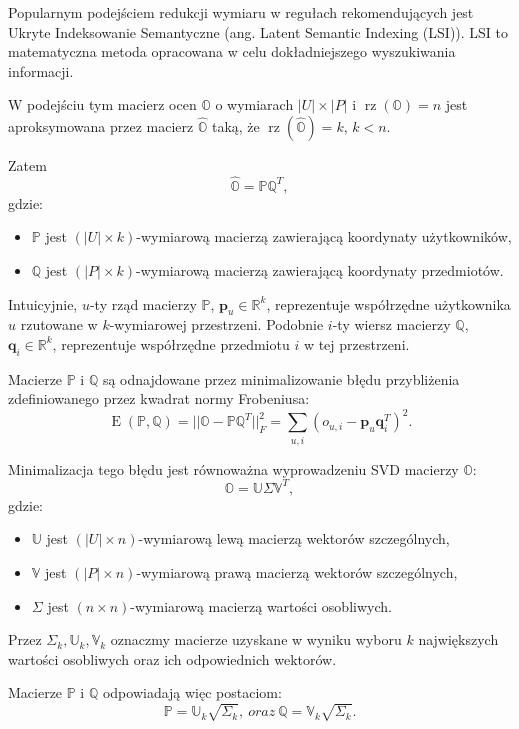 \documentclass[12pt,a4paper]{report}
\newcommand{\setR}{\mathbb{R}}
\newcommand{\rz}[1]{\operatorname{rz}\left({#1} \right)}
\newcommand{\e}[1]{\operatorname{E}\left({#1} \right)}
\begin{document}
Popularnym podejściem redukcji wymiaru w regułach rekomendujących jest Ukryte Indeksowanie Semantyczne (ang. Latent Semantic Indexing (LSI)). LSI to matematyczna metoda opracowana w celu dokładniejszego wyszukiwania informacji.

W podejściu tym macierz ocen $\mathbb{O}$ o wymiarach $|\mathit{U}| \times |\mathit{P}|$ i $\rz{\mathbb{O}} = n$ jest aproksymowana przez macierz $\widehat{\mathbb{O}}$ taką, że $\rz{\widehat{\mathbb{O}}} = k$, $k<n$. 

Zatem
$$
\widehat{\mathbb{O}} = \mathbb{P}\mathbb{Q}^T,
$$
gdzie:
\begin{itemize}
\item $\mathbb{P}$ jest $(|\mathit{U}| \times k)$-wymiarową macierzą zawierającą koordynaty użytkowników,
\item $\mathbb{Q}$ jest $(|\mathit{P}| \times k)$-wymiarową macierzą zawierającą koordynaty przedmiotów.
\end{itemize}

Intuicyjnie, $u$-ty rząd macierzy $\mathbb{P}$, $\mathbf{p}_u \in \setR^k$, reprezentuje współrzędne użytkownika $u$ rzutowane w $k$-wymiarowej przestrzeni. Podobnie $i$-ty wiersz macierzy $\mathbb{Q}$, $\mathbf{q}_i \in \setR^k$, reprezentuje współrzędne przedmiotu $i$ w tej przestrzeni.

Macierze $\mathbb{P}$ i $\mathbb{Q}$ są odnajdowane przez minimalizowanie błędu przybliżenia zdefiniowanego przez kwadrat normy Frobeniusa:
$$
\e{\mathbb{P}, \mathbb{Q}} = ||\mathbb{O}-\mathbb{P} \mathbb{Q}^T||_F^2 = \sum_{u,i}(o_{u,i} - \mathbf{p}_u\mathbf{q}_i^T)^2.
$$

Minimalizacja tego błędu jest równoważna wyprowadzeniu SVD macierzy $\mathbb{O}$:
$$
\mathbb{O} = \mathbb{U} \Sigma \mathbb{V}^T,
$$
gdzie:
\begin{itemize}
\item $\mathbb{U}$ jest $(|\mathit{U}| \times n)$-wymiarową lewą macierzą wektorów szczególnych,
\item $\mathbb{V}$ jest $(|\mathit{P}| \times n)$-wymiarową prawą macierzą wektorów szczególnych,
\item $\Sigma$ jest $(n\times n)$-wymiarową macierzą wartości osobliwych.
\end{itemize}

Przez $\Sigma_k, \mathbb{U}_k, \mathbb{V}_k$ oznaczmy macierze uzyskane w wyniku wyboru $k$ największych wartości osobliwych oraz ich odpowiednich wektorów. 

Macierze $\mathbb{P}$ i $\mathbb{Q}$ odpowiadają więc postaciom:
$$
\mathbb{P}=\mathbb{U}_k \sqrt{\Sigma_k}, \: oraz \: \mathbb{Q}=\mathbb{V}_k \sqrt{\Sigma_k}.
$$
\end{document}
